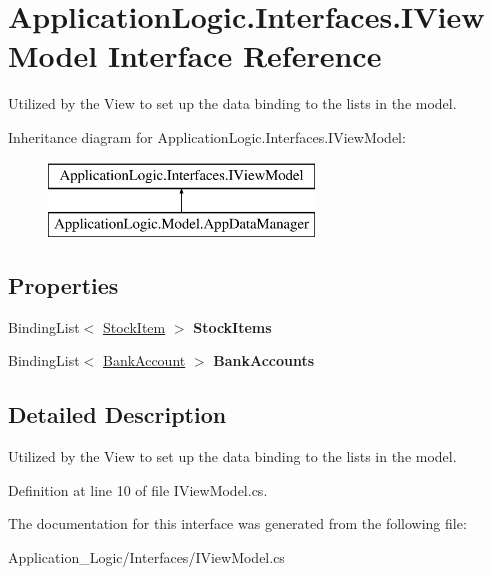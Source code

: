 \hypertarget{interface_application_logic_1_1_interfaces_1_1_i_view_model}{
\section{ApplicationLogic.Interfaces.IViewModel Interface Reference}
\label{interface_application_logic_1_1_interfaces_1_1_i_view_model}
}


Utilized by the View to set up the data binding to the lists in the model.  


Inheritance diagram for ApplicationLogic.Interfaces.IViewModel:\begin{figure}[H]
\begin{center}
\leavevmode
\includegraphics[height=2.000000cm]{interface_application_logic_1_1_interfaces_1_1_i_view_model}
\end{center}
\end{figure}
\subsection*{Properties}
\begin{DoxyCompactItemize}
\item 
\hypertarget{interface_application_logic_1_1_interfaces_1_1_i_view_model_a7567d776963a5565ef88866447ab02bf}{
BindingList$<$ \hyperlink{class_application_logic_1_1_model_1_1_stock_item}{StockItem} $>$ {\bfseries StockItems}}
\label{interface_application_logic_1_1_interfaces_1_1_i_view_model_a7567d776963a5565ef88866447ab02bf}

\item 
\hypertarget{interface_application_logic_1_1_interfaces_1_1_i_view_model_aa1a77c01e87a31b93c76e29f9b67c70d}{
BindingList$<$ \hyperlink{class_application_logic_1_1_model_1_1_bank_account}{BankAccount} $>$ {\bfseries BankAccounts}}
\label{interface_application_logic_1_1_interfaces_1_1_i_view_model_aa1a77c01e87a31b93c76e29f9b67c70d}

\end{DoxyCompactItemize}


\subsection{Detailed Description}
Utilized by the View to set up the data binding to the lists in the model. 

Definition at line 10 of file IViewModel.cs.



The documentation for this interface was generated from the following file:\begin{DoxyCompactItemize}
\item 
Application\_\-Logic/Interfaces/IViewModel.cs\end{DoxyCompactItemize}
